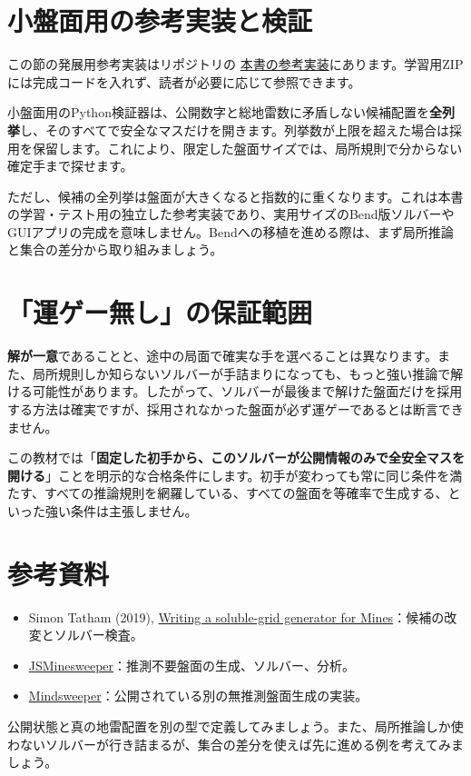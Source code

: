 \documentclass[11pt,a4paper,openany]{book}
\newcommand{\exercise}[1]{\begin{exercisebox}\RaggedRight #1\end{exercisebox}}
\begin{document}
\section{小盤面用の参考実装と検証}
この節の発展用参考実装はリポジトリの
\href{https://github.com/Nasu726/bend2-intro-with-life/tree/feat/intermediate-minesweeper-textbook/intermediate/solutions}{本書の参考実装}にあります。学習用ZIPには完成コードを入れず、読者が必要に応じて参照できます。

小盤面用のPython検証器は、公開数字と総地雷数に矛盾しない候補配置を\textbf{全列挙}し、そのすべてで安全なマスだけを開きます。列挙数が上限を超えた場合は採用を保留します。これにより、限定した盤面サイズでは、局所規則で分からない確定手まで探せます。

ただし、候補の全列挙は盤面が大きくなると指数的に重くなります。これは本書の学習・テスト用の独立した参考実装であり、実用サイズのBend版ソルバーやGUIアプリの完成を意味しません。Bendへの移植を進める際は、まず局所推論と集合の差分から取り組みましょう。

\section{「運ゲー無し」の保証範囲}
\textbf{解が一意}であることと、途中の局面で確実な手を選べることは異なります。また、局所規則しか知らないソルバーが手詰まりになっても、もっと強い推論で解ける可能性があります。したがって、ソルバーが最後まで解けた盤面だけを採用する方法は確実ですが、採用されなかった盤面が必ず運ゲーであるとは断言できません。

この教材では「\textbf{固定した初手から、このソルバーが公開情報のみで全安全マスを開ける}」ことを明示的な合格条件にします。初手が変わっても常に同じ条件を満たす、すべての推論規則を網羅している、すべての盤面を等確率で生成する、といった強い条件は主張しません。

\section*{参考資料}
\begin{itemize}[leftmargin=*]
\item Simon Tatham (2019), \href{https://www.chiark.greenend.org.uk/~sgtatham/quasiblog/mines-solver/}{Writing a soluble-grid generator for Mines}：候補の改変とソルバー検査。
\item \href{https://github.com/DavidNHill/JSMinesweeper}{JSMinesweeper}：推測不要盤面の生成、ソルバー、分析。
\item \href{https://github.com/AlexBuz/mindsweeper}{Mindsweeper}：公開されている別の無推測盤面生成の実装。
\end{itemize}
\exercise{公開状態と真の地雷配置を別の型で定義してみましょう。また、局所推論しか使わないソルバーが行き詰まるが、集合の差分を使えば先に進める例を考えてみましょう。}
\end{document}
